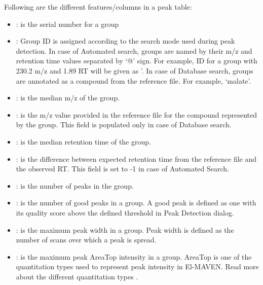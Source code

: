 \documentclass[letterpaper,10pt,english,openany,oneside]{sphinxmanual}
\begin{document}
Following are the different features/columns in a peak table:
\begin{itemize}
\item {} 
\sphinxstyleemphasis{\#}: is the serial number for a group

\item {} 
: Group ID is assigned according to the search mode used during peak detection. In case of Automated search, groups are named by their m/z and retention time values separated by ‘@’ sign. For example, ID for a group with 230.2 m/z and 1.89 RT will be given as ’. In case of Database search, groups are annotated as a compound from the reference file. For example, ‘malate’.

\item {} 
: is the median m/z of the group.

\item {} 
: is the m/z value provided in the reference file for the compound represented by the group. This field is populated only in case of Database search.

\item {} 
: is the median retention time of the group.

\item {} 
: is the difference between expected retention time from the reference file and the observed RT. This field is set to -1 in case of Automated Search.

\item {} 
: is the number of peaks in the group.

\item {} 
: is the number of good peaks in a group. A good peak is defined as one with its quality score above the defined threshold in Peak Detection dialog.

\item {} 
: is the maximum peak width in a group. Peak width is defined as the number of scans over which a peak is spread.

\item {} 
: is the maximum peak AreaTop intensity in a group. AreaTop is one of the quantitation types used to represent peak intensity in El-MAVEN. Read more about the different quantitation types .


\end{itemize}
\end{document}
